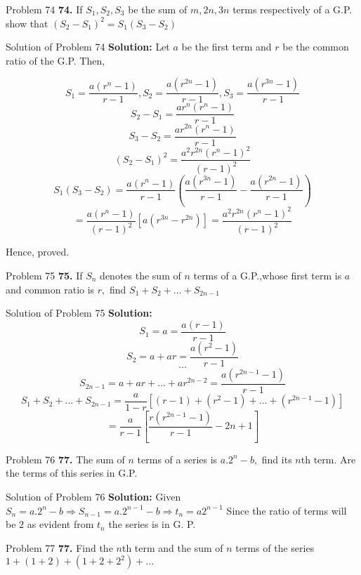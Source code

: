 \documentclass[aspectratio=1610,8pt]{beamer}
\begin{document}
\begin{frame}{Problem 74}
  \textbf{74.} If $S_1, S_2, S_3$ be the sum of $m, 2n, 3n$ terms respectively of a G.P. show that $(S_2 - S_1)^2 = S_1(S_3 - S_2)$
\end{frame}
\begin{frame}{Solution of Problem 74}
  \textbf{Solution:} Let $a$ be the first term and $r$ be the common ratio of the G.P. Then,

  $$S_1 = \frac{a(r^n - 1)}{r - 1}, S_2 = \frac{a(r^{2n} - 1)}{r - 1}, S_3 = \frac{a(r^{3n} - 1)}{r - 1}$$
  $$S_2 - S_1 = \frac{ar^n(r^n - 1)}{r - 1}$$
  $$S_3 - S_2 = \frac{ar^{2n}(r^n - 1)}{r - 1}$$
  $$(S_2 - S_1)^2 = \frac{a^2r^{2n}(r^n - 1)^2}{(r - 1)^2}$$
  $$S_1(S_3 - S_2) = \frac{a(r^n - 1)}{r - 1}\left(\frac{a(r^{3n} - 1)}{r - 1}- \frac{a(r^{2n} - 1)}{r - 1}\right)$$
  $$= \frac{a(r^n - 1)}{(r - 1)^2}[a(r^{3n} - r^{2n})] = \frac{a^2r^{2n}(r^n - 1)^2}{(r - 1)^2}$$

  Hence, proved.
\end{frame}
\begin{frame}{Problem 75}
  \textbf{75.} If $S_n$ denotes the sum of $n$ terms of a G.P.,whose first term is $a$ and common ratio is $r,$ find $S_1 + S_2 +  \ldots + S_{2n - 1}$
\end{frame}
\begin{frame}{Solution of Problem 75}
  \textbf{Solution:} $$S_1 = a = \frac{a(r - 1)}{r - 1}$$
  $$S_2 = a + ar = \frac{a(r^2 - 1)}{r - 1}$$
  $$\ldots$$
  $$S_{2n - 1} = a + ar + \ldots+ ar^{2n- 2} = \frac{a(r^{2n- 1} - 1)}{r - 1}$$
  $$S_1 + S_2 + \ldots + S_{2n - 1} = \frac{a}{1- r}\left[(r - 1) + (r^2 - 1) + \ldots + (r^{2n - 1} - 1)\right]$$
  $$ = \frac{a}{r - 1}\left[\frac{r(r^{2n - 1} - 1)}{r - 1} - 2n + 1\right]$$
\end{frame}
\begin{frame}{Problem 76}
  \textbf{77.} The sum of $n$ terms of a series is $a.2^n - b,$ find its $n$th term. Are the terms of this series in G.P.
\end{frame}
\begin{frame}{Solution of Problem 76}
  \textbf{Solution:} Given $S_n = a.2^n - b \Rightarrow S_{n - 1} = a.2^{n - 1} - b\Rightarrow t_n= a2^{n - 1}$ Since the ratio of
  terms will be $2$ as evident from $t_n$ the series is in G. P.
\end{frame}
\begin{frame}{Problem 77}
  \textbf{77.} Find the $n$th term and the sum of $n$ terms of the series $1 + (1 + 2) + (1 + 2 + 2^2) + \ldots$
\end{frame}
\end{document}
